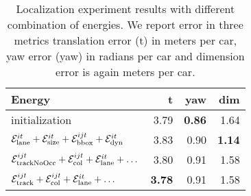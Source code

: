 \begin{table}
  \centering
  \begin{tabular}{lrrr}
    \toprule
    Energy & t & yaw & dim \\
    \midrule
    initialization                                                                                  & 3.79 & \textbf{0.86} & 1.64 \\
    $\mathcal{E}^{it}_{\text{lane}}+\mathcal{E}^{it}_{\text{size}}+\mathcal{E}^{ijt}_{\text{bbox}}+\mathcal{E}^{it}_{\text{dyn}}                                       $ & 3.83 & 0.90 & \textbf{1.14} \\
    $\mathcal{E}^{ijt}_{\text{trackNoOcc}}+\mathcal{E}^{ijt}_{\text{col}} + \mathcal{E}^{it}_{\text{lane}} + \dots$  & 3.80 & 0.91 & 1.58 \\
    $\mathcal{E}^{ijt}_{\text{track}}+\mathcal{E}^{ijt}_{\text{col}} + \mathcal{E}^{it}_{\text{lane}} + \dots$ & \textbf{3.78} & 0.91 & 1.58 \\
    \bottomrule
  \end{tabular}
  \caption{Localization experiment results with different combination of energies. We report error in three metrics translation error (t) in meters per car, yaw error (yaw) in radians per car and dimension error is again meters per car.}
  \label{tab:localizationExperiment}
\end{table}
